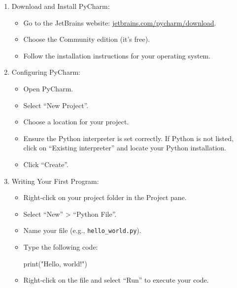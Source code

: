 \documentclass[
  letterpaper,
  DIV=11,
  numbers=noendperiod]{scrreprt}
\newenvironment{Shaded}{\begin{snugshade}}{\end{snugshade}}
\newcommand{\BuiltInTok}[1]{\textcolor[rgb]{0.00,0.23,0.31}{#1}}
\newcommand{\NormalTok}[1]{\textcolor[rgb]{0.00,0.23,0.31}{#1}}
\newcommand{\StringTok}[1]{\textcolor[rgb]{0.13,0.47,0.30}{#1}}
\providecommand{\tightlist}{%
  \setlength{\itemsep}{0pt}\setlength{\parskip}{0pt}}\usepackage{longtable,booktabs,array}
\begin{document}
\begin{enumerate}
\def\labelenumi{\arabic{enumi}.}
\tightlist
\item
  Download and Install PyCharm:

  \begin{itemize}
  \tightlist
  \item
    Go to the JetBrains website:
    \href{https://www.jetbrains.com/pycharm/download/}{jetbrains.com/pycharm/download}.
  \item
    Choose the Community edition (it's free).
  \item
    Follow the installation instructions for your operating system.
  \end{itemize}
\item
  Configuring PyCharm:

  \begin{itemize}
  \tightlist
  \item
    Open PyCharm.
  \item
    Select ``New Project''.
  \item
    Choose a location for your project.
  \item
    Ensure the Python interpreter is set correctly. If Python is not
    listed, click on ``Existing interpreter'' and locate your Python
    installation.
  \item
    Click ``Create''.
  \end{itemize}
\item
  Writing Your First Program:

  \begin{itemize}
  \item
    Right-click on your project folder in the Project pane.
  \item
    Select ``New'' \textgreater{} ``Python File''.
  \item
    Name your file (e.g., \texttt{hello\_world.py}).
  \item
    Type the following code:

\begin{Shaded}
\begin{Highlighting}[]
\BuiltInTok{print}\NormalTok{(}\StringTok{"Hello, world!"}\NormalTok{)}
\end{Highlighting}
\end{Shaded}
  \item
    Right-click on the file and select ``Run'' to execute your code.
  \end{itemize}
\end{enumerate}
\end{document}
